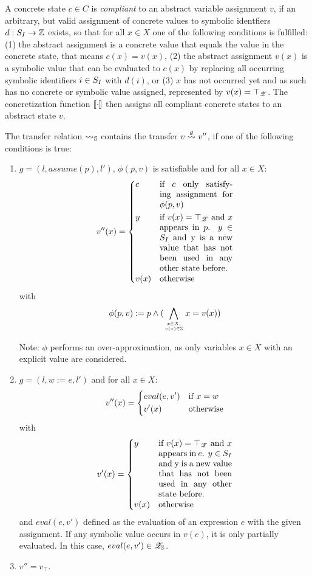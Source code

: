 A concrete state $c \in C$ is \emph{compliant} to an abstract variable assignment $v$, if an arbitrary, but valid assignment of concrete values to symbolic identfiers $d: S_I \rightarrow \mathbb{Z}$ exists, so that for all $x \in X$ one of the following conditions is fulfilled:
(1) the abstract assignment is a concrete value that equals the value in the concrete state, that means $c(x) = v(x)$,
(2) the abstract assignment $v(x)$ is a symbolic value that can be evaluated to $c(x)$ by replacing all occurring symbolic identifiers $i \in S_I$ with $d(i)$, or
(3) $x$ has not occurred yet and as such has no concrete or symbolic value assigned, represented by $v(x) = \top_{\mathscr{Z}}$.
The concretization function $[\![ \cdot ]\!]$ then assigns all compliant concrete states to an abstract state $v$.

The transfer relation $\rightsquigarrow_{\mathbb{S}}$ contains the transfer $v \overset{g}{\rightsquigarrow} v''$, if one of the following conditions is true:
    \begin{enumerate}[1.]
      \item $g = (l, assume(p), l')$, $\phi (p, v)$ is satisfiable and for all $x \in X$:
        \[
          v''(x) = \begin{dcases}
            c    & \parbox[t]{.25\textwidth}{if $c$ only satisfying assignment for $\phi (p, v)$}\\
            y    & \parbox[t]{.25\textwidth}{if $v(x) = \top_\valueset$ and $x$ appears in $p$. $y \in S_I$ and y is a new value that has not been used in any other state before.}\\
            v(x) & \text{otherwise}              
          \end{dcases}
        \]
        with \[\phi (p, v) := p \wedge (\displaystyle\bigwedge_{x \in X,\atop {v(x) \in \mathbb{Z}}} x = v(x))\]

        Note: $\phi$ performs an over-approximation, as only variables $x \in X$ with an explicit value are considered.

      \item $g = (l, w := e, l')$ and for all $x \in X$:
        \[
          v''(x) = \begin{dcases}
            eval(e, v') & \text{if $x = w$} \\
            v'(x)        & \text{otherwise}
          \end{dcases}
        \]
      with \[
         v'(x) = \begin{dcases}
            y    & \parbox[t]{.25\textwidth}{if $v(x) = \top_\valueset$ and $x$ appears in $e$. $y \in S_I$ and y is a new value that has not been used in any other state before.}\\
            v(x) & \text{otherwise}
          \end{dcases}
      \]
      and $eval(e, v')$ defined as the evaluation of an expression $e$ with the given assignment.
      If any symbolic value occurs in $v(e)$, it is only partially evaluated. In this case, $eval(e, v') \in \mathscr{Z}_{\mathbb{S}}$.

      \item $v'' = v_\top$.
    \end{enumerate}
